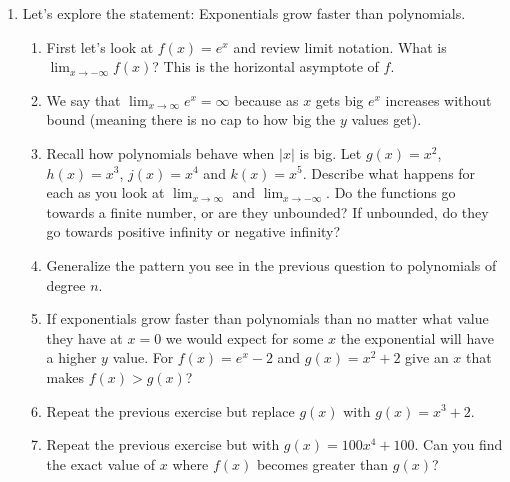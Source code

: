 \documentclass[12pt]{article}
\theoremstyle{plain}     %
\begin{document}
\begin{enumerate}
		\item \hspace{-2em}\llap{$*$}\hspace{2em} Let's explore the statement: Exponentials grow faster than polynomials.
			\begin{enumerate}
				\item First let's look at $f(x)=e^x$ and review limit notation. What is $\displaystyle \lim_{x\to -\infty} f(x)$? This is the horizontal asymptote of $f$.
				\item We say that $\displaystyle \lim_{x\to \infty} e^x =\infty$ because as $x$ gets big $e^x$ increases without bound (meaning there is no cap to how big the $y$ values get).
				\item Recall how polynomials behave when $|x|$ is big. Let $g(x)=x^2$, $h(x)=x^3$, $j(x)=x^4$ and $k(x)=x^5$. Describe what happens for each as you look at $\lim_{x\to \infty}$ and $\lim_{x\to -\infty}$. Do the functions go towards a finite number, or are they unbounded? If unbounded, do they go towards positive infinity or negative infinity?
				\item Generalize the pattern you see in the previous question to polynomials of degree $n$.
				\item If exponentials grow faster than polynomials than no matter what value they have at $x=0$ we would expect for some $x$ the exponential will have a higher $y$ value. For $f(x)=e^x-2$ and $g(x)=x^2+2$ give an $x$ that makes $f(x)>g(x)$?
				\item Repeat the previous exercise but replace $g(x)$ with $g(x)=x^3+2$.
				\item Repeat the previous exercise but with $g(x)=100x^4+100$. Can you find the exact value of $x$ where $f(x)$ becomes greater than $g(x)$?
			\end{enumerate}					
		
		
			
\end{enumerate}
		
	
	
\end{document}
